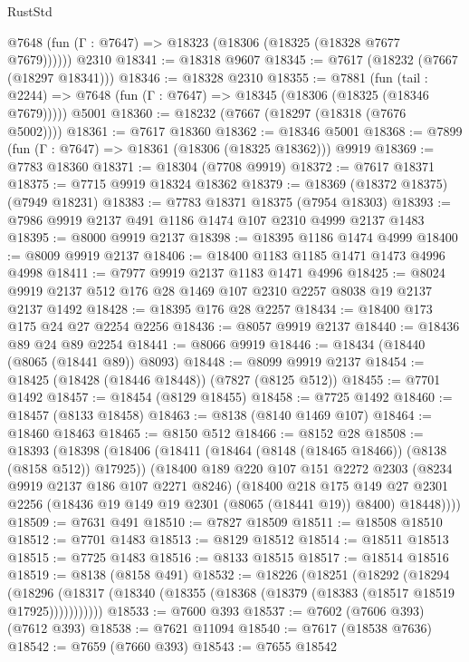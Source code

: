 \begin{lexlean}{RustStd}
\begin{coremodule}
      @7648 (fun (Γ : @7647) => @18323 (@18306 (@18325 (@18328 @7677 @7679))))))
    @2310
@18341 := @18318 @9607
@18345 := @7617 (@18232 (@7667 (@18297 @18341)))
@18346 := @18328 @2310
@18355 := @7881
    (fun (tail : @2244) => @7648 (fun (Γ : @7647) => @18345 (@18306 (@18325 (@18346 @7679)))))
    @5001
@18360 := @18232 (@7667 (@18297 (@18318 (@7676 @5002))))
@18361 := @7617 @18360
@18362 := @18346 @5001
@18368 := @7899 (fun (Γ : @7647) => @18361 (@18306 (@18325 @18362))) @9919
@18369 := @7783 @18360
@18371 := @18304 (@7708 @9919)
@18372 := @7617 @18371
@18375 := @7715 @9919 @18324 @18362
@18379 := @18369 (@18372 @18375) (@7949 @18231)
@18383 := @7783 @18371 @18375 (@7954 @18303)
@18393 := @7986 @9919 @2137 @491 @1186 @1474 @107 @2310 @4999 @2137 @1483
@18395 := @8000 @9919 @2137
@18398 := @18395 @1186 @1474 @4999
@18400 := @8009 @9919 @2137
@18406 := @18400 @1183 @1185 @1471 @1473 @4996 @4998
@18411 := @7977 @9919 @2137 @1183 @1471 @4996
@18425 := @8024 @9919 @2137 @512 @176 @28 @1469 @107 @2310 @2257 @8038 @19 @2137 @2137 @1492
@18428 := @18395 @176 @28 @2257
@18434 := @18400 @173 @175 @24 @27 @2254 @2256
@18436 := @8057 @9919 @2137
@18440 := @18436 @89 @24 @89 @2254
@18441 := @8066 @9919
@18446 := @18434 (@18440 (@8065 (@18441 @89)) @8093)
@18448 := @8099 @9919 @2137
@18454 := @18425 (@18428 (@18446 @18448)) (@7827 (@8125 @512))
@18455 := @7701 @1492
@18457 := @18454 (@8129 @18455)
@18458 := @7725 @1492
@18460 := @18457 (@8133 @18458)
@18463 := @8138 (@8140 @1469 @107)
@18464 := @18460 @18463
@18465 := @8150 @512
@18466 := @8152 @28
@18508 := @18393
    (@18398
      (@18406
        (@18411 (@18464 (@8148 (@18465 @18466)) (@8138 (@8158 @512)) @17925))
        (@18400
          @189
          @220
          @107
          @151
          @2272
          @2303
          (@8234 @9919 @2137 @186 @107 @2271 @8246)
          (@18400
            @218
            @175
            @149
            @27
            @2301
            @2256
            (@18436 @19 @149 @19 @2301 (@8065 (@18441 @19)) @8400)
            @18448))))
@18509 := @7631 @491
@18510 := @7827 @18509
@18511 := @18508 @18510
@18512 := @7701 @1483
@18513 := @8129 @18512
@18514 := @18511 @18513
@18515 := @7725 @1483
@18516 := @8133 @18515
@18517 := @18514 @18516
@18519 := @8138 (@8158 @491)
@18532 := @18226
    (@18251
      (@18292
        (@18294
          (@18296 (@18317 (@18340 (@18355 (@18368 (@18379 (@18383 (@18517 @18519 @17925)))))))))))
@18533 := @7600 @393
@18537 := @7602 (@7606 @393) (@7612 @393)
@18538 := @7621 @11094
@18540 := @7617 (@18538 @7636)
@18542 := @7659 (@7660 @393)
@18543 := @7655 @18542

\end{coremodule}
\end{lexlean}
